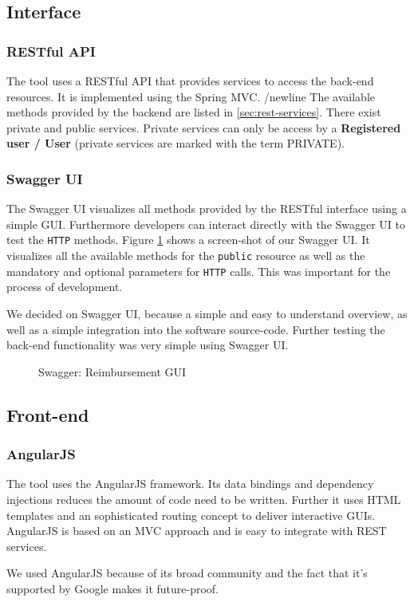 \subsection{Interface}

\subsubsection{RESTful API}
\label{sec:restfulapi}
The tool uses a RESTful API that provides services to access the back-end resources. It is implemented using the Spring MVC. /newline
The available methods provided by the backend are listed in \ref{sec:rest-services}. There exist private and public services. Private services can only be access by a \textbf{Registered user / User} (private services are marked with the term PRIVATE).

\subsubsection{Swagger UI}
The Swagger UI visualizes all methods provided by the RESTful interface using a simple GUI. Furthermore developers can interact directly with the Swagger UI to test the \texttt{HTTP} methods. Figure \ref{fig:swagger01} shows a screen-shot of our Swagger UI. It visualizes all the available methods for the \texttt{public} resource as well as the mandatory and optional parameters for \texttt{HTTP} calls. This was important for the process of development. \cite{swagger} \par
We decided on Swagger UI, because a simple and easy to understand overview, as well as a simple integration into the software source-code. Further testing the back-end functionality was very simple using Swagger UI.

\begin{figure}[H]
    \centering
    \caption{Swagger: Reimbursement GUI}
    \label{fig:swagger01}
\end{figure}

\subsection{Front-end}

\subsubsection{AngularJS}
The tool uses the AngularJS framework. Its data bindings and dependency injections reduces the amount of code need to be written. Further it uses HTML templates and an sophisticated routing concept to deliver interactive GUIs. AngularJS is based on an MVC approach and is easy to integrate with REST services.\cite{angular}\par
We used AngularJS because of its broad community and the fact that it's supported by Google makes it future-proof.


